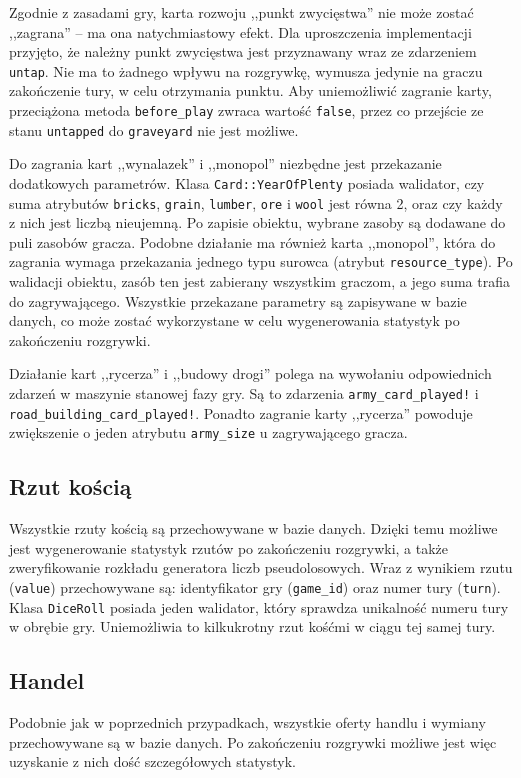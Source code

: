 \documentclass[11pt,twoside]{report}
\begin{document}
Zgodnie z zasadami gry, karta rozwoju ,,punkt zwycięstwa'' nie może
zostać ,,zagrana'' -- ma ona natychmiastowy efekt. Dla uproszczenia
implementacji przyjęto, że należny punkt zwycięstwa jest przyznawany
wraz ze zdarzeniem \texttt{untap}. Nie ma to żadnego wpływu na
rozgrywkę, wymusza jedynie na graczu zakończenie tury, w celu
otrzymania punktu. Aby uniemożliwić zagranie karty, przeciążona metoda
\texttt{before\_play} zwraca wartość \texttt{false}, przez co
przejście ze stanu \texttt{untapped} do \texttt{graveyard} nie jest
możliwe.

Do zagrania kart ,,wynalazek'' i ,,monopol'' niezbędne jest
przekazanie dodatkowych parametrów. Klasa \texttt{Card::YearOfPlenty}
posiada walidator, czy suma atrybutów \texttt{bricks}, \texttt{grain},
\texttt{lumber}, \texttt{ore} i \texttt{wool} jest równa 2, oraz czy
każdy z nich jest liczbą nieujemną. Po zapisie obiektu, wybrane zasoby
są dodawane do puli zasobów gracza. Podobne działanie ma również karta
,,monopol'', która do zagrania wymaga przekazania jednego typu surowca
(atrybut \texttt{resource\_type}). Po walidacji obiektu, zasób ten
jest zabierany wszystkim graczom, a jego suma trafia do
zagrywającego. Wszystkie przekazane parametry są zapisywane w bazie
danych, co może zostać wykorzystane w celu wygenerowania statystyk po
zakończeniu rozgrywki.

Działanie kart ,,rycerza'' i ,,budowy drogi'' polega na wywołaniu
odpowiednich zdarzeń w maszynie stanowej fazy gry. Są to zdarzenia
\texttt{army\_card\_played!} i
\texttt{road\_building\_card\_played!}. Ponadto zagranie karty
,,rycerza'' powoduje zwiększenie o jeden atrybutu \texttt{army\_size}
u zagrywającego gracza.

\subsection{Rzut kością}

Wszystkie rzuty kością są przechowywane w bazie danych. Dzięki temu
możliwe jest wygenerowanie statystyk rzutów po zakończeniu rozgrywki,
a także zweryfikowanie rozkładu generatora liczb pseudolosowych. Wraz
z wynikiem rzutu (\texttt{value}) przechowywane są: identyfikator gry
(\texttt{game\_id}) oraz numer tury (\texttt{turn}). Klasa
\texttt{DiceRoll} posiada jeden walidator, który sprawdza unikalność
numeru tury w obrębie gry. Uniemożliwia to kilkukrotny rzut kośćmi w
ciągu tej samej tury.

\subsection{Handel}
Podobnie jak w poprzednich przypadkach, wszystkie oferty handlu i
wymiany przechowywane są w bazie danych. Po zakończeniu rozgrywki
możliwe jest więc uzyskanie z nich dość szczegółowych
statystyk.
\end{document}
